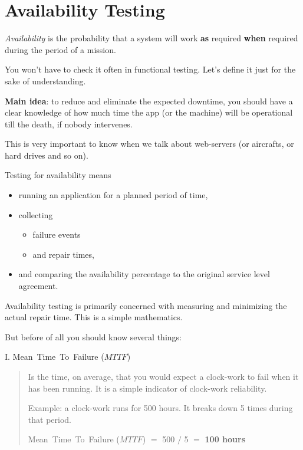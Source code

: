 \section{Availability Testing}
\label{sec:Availability Testing}

\emph{Availability} is the probability that a system will work \textbf{as} required \textbf{when} required during the period of a mission. 

You won't have to check it often in functional testing. Let's define it just for the sake of understanding.

\textbf{Main idea}: to reduce and eliminate the expected downtime, you should have a clear knowledge of how much time the app (or the machine) will be operational till the death, if nobody intervenes.

This is very important to know when we talk about web-servers (or aircrafts, or hard drives and so on).

Testing for availability means 
\begin{itemize}
\item 
running an application for a planned period of time, 
\item 
collecting 
	\begin{itemize}
	\item 
	failure events 
	\item
	and repair times, 
	\end{itemize}
\item 
and comparing the availability percentage to the original service level agreement.                                                                                                                                                                                                                  \end{itemize}

Availability testing is primarily concerned with measuring and minimizing the actual repair time. This is a simple mathematics. 

But before of all you should know several things:

I. Mean~Time~To~Failure ($MTTF$) 

\begin{quote}
Is the time, on average, that you would expect a clock-work to fail when it has been running. It is a simple indicator of  clock-work reliability.

Example: a clock-work runs for 500 hours. It breaks down 5 times during that period.

Mean~Time~To~Failure ($MTTF$) $=$ 500 $/$ 5 $=$ \textbf{100 hours}
\end{quote} 

